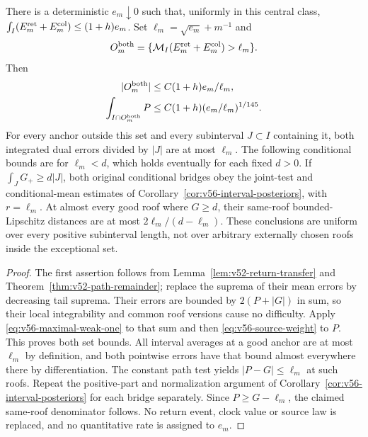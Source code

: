 \begin{theorem}
\label{thm:v56-return-maximal}
There is a deterministic $e_m\downarrow0$ such that, uniformly in
this central class,
$\int_I(E_m^{\rm ret}+E_m^{\rm col})\le(1+h)e_m$.
Set $\ell_m=\sqrt{e_m}+m^{-1}$ and
\[
 O_m^{\rm both}=
 \{\mathcal M_I(E_m^{\rm ret}+E_m^{\rm col})>\ell_m\}.
\]
Then
\begin{align}
 |O_m^{\rm both}|&\le C(1+h)e_m/\ell_m,
                                      \label{eq:v56-return-bad-length}\\
 \int_{I\cap O_m^{\rm both}}P
       &\le C(1+h)(e_m/\ell_m)^{1/145}.
                                      \label{eq:v56-return-bad-source}
\end{align}
For every anchor outside this set and every subinterval $J\subset I$
containing it, both integrated dual errors divided by $|J|$ are at
most $\ell_m$. The following conditional bounds are for $\ell_m<d$,
which holds eventually for each fixed $d>0$.
If $\int_JG_+\ge d|J|$, both original conditional
bridges obey the joint-test and conditional-mean estimates of
Corollary~\ref{cor:v56-interval-posteriors}, with $r=\ell_m$.
At almost every good roof where $G\ge d$, their same-roof
bounded-Lipschitz distances are at most $2\ell_m/(d-\ell_m)$.
These conclusions are uniform over every positive subinterval length,
not over arbitrary externally chosen roofs inside the exceptional set.
\end{theorem}
\begin{proof}
The first assertion follows from
Lemma~\ref{lem:v52-return-transfer} and
Theorem~\ref{thm:v52-path-remainder}; replace the suprema of their
mean errors by decreasing tail suprema. Their errors are bounded
by $2(P+|G|)$ in sum, so their local integrability and common roof
versions cause no difficulty. Apply
\eqref{eq:v56-maximal-weak-one} to that sum and then
\eqref{eq:v56-source-weight} to $P$. This proves both set bounds.
All interval averages at a good anchor are at most $\ell_m$ by
definition, and both pointwise errors have that bound almost
everywhere there by differentiation. The constant path test yields
$|P-G|\le\ell_m$ at such roofs. Repeat the positive-part and
normalization argument of Corollary~\ref{cor:v56-interval-posteriors}
for each bridge separately. Since $P\ge G-\ell_m$, the claimed
same-roof denominator follows. No return event, clock value or source
law is replaced, and no quantitative rate is assigned to $e_m$.
\end{proof}

